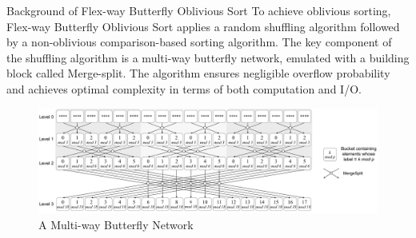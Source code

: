 \documentclass[final,hyperref={pdfpagelabels=false}]{beamer}
\begin{document}
\begin{frame}
\begin{columns}[t]
\begin{column}{.25\linewidth}
      \begin{block}{Background of Flex-way Butterfly Oblivious Sort}
        To achieve oblivious sorting, Flex-way Butterfly Oblivious Sort applies a random shuffling algorithm followed by a non-oblivious comparison-based sorting algorithm. The key component of the shuffling algorithm is a multi-way butterfly network, emulated with a building block called Merge-split. The algorithm ensures negligible overflow probability and achieves optimal complexity in terms of both computation and I/O.
        \begin{figure}
          \includegraphics[width=\linewidth]{assets/multi-way-butterfly.png}
          \caption{A Multi-way Butterfly Network}
        \end{figure}
      \end{block}

    \end{column}


\end{columns}
\end{frame}
\end{document}
